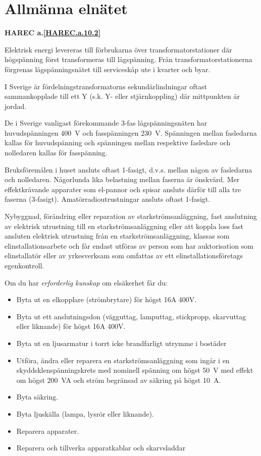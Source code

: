 \section{Allmänna elnätet}
\textbf{
HAREC a.\ref{HAREC.a.10.2}\label{myHAREC.a.10.2}
}
\label{jordning}

Elektrisk energi levereras till förbrukarna över
transformatorstationer där högspänning först transformeras till
lågspänning. Från transformatorstationerna förgrenas lågspänningsnätet
till serviceskåp ute i kvarter och byar.

I Sverige är fördelningstransformatorns sekundärlindningar oftast
sammankopplade till ett Y (s.k. Y- eller stjärnkoppling) där
mittpunkten är jordad.

De i Sverige vanligast förekommande 3-fas lågspänningsnäten har
huvudspänningen 400~V och fasspänningen 230~V. Spänningen mellan fasledarna
kallas för huvudspänning och spänningen mellan respektive fasledare och
nolledaren kallas för fasspänning.

Bruksföremålen i huset ansluts oftast 1-fasigt, d.v.s. mellan någon av
fasledarna och nolledaren.
Någorlunda lika belastning mellan faserna är önskvärd.
Mer effektkrävande apparater som el-pannor och spisar ansluts därför till alla
tre faserna (3-fasigt).
Amatörradioutrustningar ansluts oftast 1-fasigt.

Nybyggnad, förändring eller reparation av starkströmsanläggning,
fast anslutning av elektrisk utrustning till en starkströmsanläggning
eller att koppla loss fast ansluten elektrisk utrustning från en
starkströmsanläggning, klassas som elinstallationsarbete och får endast
utföras av person som har auktorisation som elinstallatör eller av
yrkesverksam som omfattas av ett elinstallationsföretags egenkontroll.

Om du har \emph{erforderlig kunskap} om elsäkerhet får du:
\begin{itemize}
\item Byta ut en elkopplare (strömbrytare) för högst 16A 400V.
\item Byta ut ett anslutningsdon (vägguttag, lamputtag, stickpropp,
skarvuttag eller liknande) för högst 16A 400V.
\item Byta ut en ljusarmatur i torrt icke brandfarligt utrymme i bostäder
\item Utföra, ändra eller reparera en starkströmsanläggning som ingår i en
skyddsklenspänningskrets med nominell spänning om högst 50~V med effekt om
högst 200~VA och ström begränsad av säkring på högst 10~A.
\item Byta säkring.
\item Byta ljuskälla (lampa, lysrör eller liknande).
\item Reparera apparater.
\item Reparera och tillverka apparatkablar och skarvsladdar
\end{itemize}

